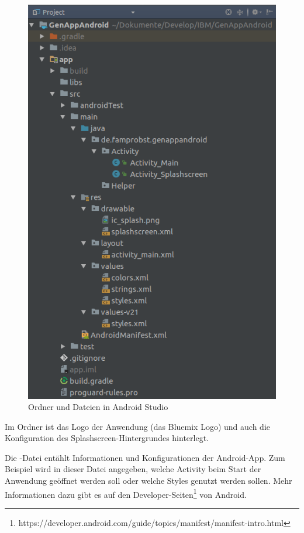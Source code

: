 \begin{figure}[h]
 \centering
   \includegraphics[scale=0.4]{images/kapitel_4/androidstudio_folder.png}
 \caption{Ordner und Dateien in Android Studio}
 \label{fig:androidstudio_folder}
\end{figure}

Im Ordner  ist das Logo der Anwendung (das Bluemix Logo) und auch die Konfiguration des
Splashscreen-Hintergrundes hinterlegt.

Die -Datei entählt Informationen und Konfigurationen der Android-App. Zum Beispiel wird in dieser Datei
angegeben, welche Activity beim Start der Anwendung geöffnet werden soll oder welche Styles genutzt werden sollen. Mehr
Informationen dazu gibt es auf den Developer-Seiten\footnote{https://developer.android.com/guide/topics/manifest/manifest-intro.html}
von Android.

